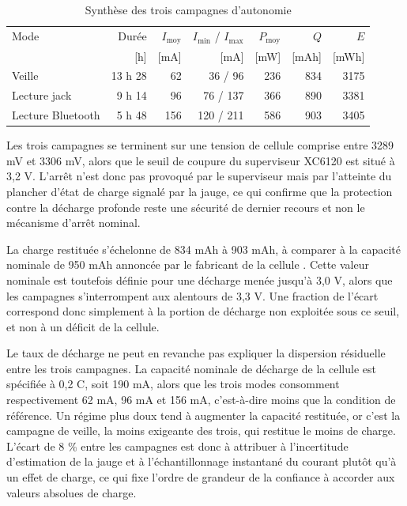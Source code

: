 \begin{table}[H]
    \centering
    \caption{Synthèse des trois campagnes d'autonomie}
    \label{tab:auton_synthese}
    \begin{tabular}{lrrrrrr}
        \toprule
        Mode              & Durée   & $I_\text{moy}$ & $I_\text{min}$ / $I_\text{max}$ & $P_\text{moy}$ & $Q$   & $E$   \\
                          & [h]     & [mA]           & [mA]                            & [mW]           & [mAh] & [mWh] \\
        \midrule
        Veille            & 13 h 28 & 62             & 36 / 96                         & 236            & 834   & 3175  \\
        Lecture jack      & 9 h 14  & 96             & 76 / 137                        & 366            & 890   & 3381  \\
        Lecture Bluetooth & 5 h 48  & 156            & 120 / 211                       & 586            & 903   & 3405  \\
        \bottomrule
    \end{tabular}
\end{table}

Les trois campagnes se terminent sur une tension de cellule comprise entre 3289 mV et 3306 mV, alors que le seuil de coupure du superviseur XC6120 est situé à 3,2 V. L'arrêt n'est donc pas provoqué par le superviseur mais par l'atteinte du plancher d'état de charge signalé par la jauge, ce qui confirme que la protection contre la décharge profonde reste une sécurité de dernier recours et non le mécanisme d'arrêt nominal.

La charge restituée s'échelonne de 834 mAh à 903 mAh, à comparer à la capacité nominale de 950 mAh annoncée par le fabricant de la cellule \cite{jauch_LP523450JU}. Cette valeur nominale est toutefois définie pour une décharge menée jusqu'à 3,0 V, alors que les campagnes s'interrompent aux alentours de 3,3 V. Une fraction de l'écart correspond donc simplement à la portion de décharge non exploitée sous ce seuil, et non à un déficit de la cellule.

Le taux de décharge ne peut en revanche pas expliquer la dispersion résiduelle entre les trois campagnes. La capacité nominale de décharge de la cellule est spécifiée à 0,2 C, soit 190 mA, alors que les trois modes consomment respectivement 62 mA, 96 mA et 156 mA, c'est-à-dire moins que la condition de référence. Un régime plus doux tend à augmenter la capacité restituée, or c'est la campagne de veille, la moins exigeante des trois, qui restitue le moins de charge. L'écart de 8 \% entre les campagnes est donc à attribuer à l'incertitude d'estimation de la jauge et à l'échantillonnage instantané du courant plutôt qu'à un effet de charge, ce qui fixe l'ordre de grandeur de la confiance à accorder aux valeurs absolues de charge.

